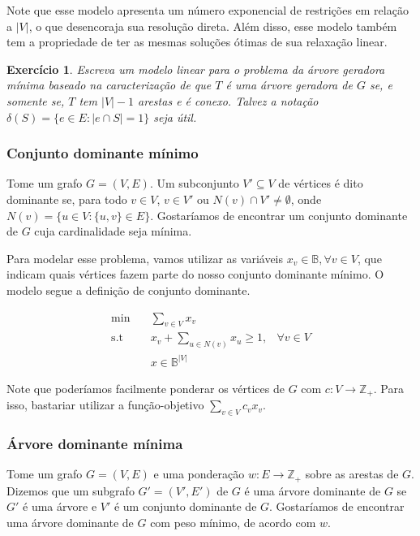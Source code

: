 \documentclass[]{article}
\newtheorem{exercicio}{Exercício}
\numberwithin{equation}{section}
\begin{document}
Note que esse modelo apresenta um número exponencial de restrições em relação a $|V|$, o que
desencoraja sua resolução direta.
Além disso, esse modelo também tem a propriedade de ter as mesmas soluções ótimas de sua relaxação
linear.

\begin{exercicio}
  Escreva um modelo linear para o problema da árvore geradora mínima baseado na caracterização de que
  $T$ é uma árvore geradora de $G$ se, e somente se, $T$ tem $|V| - 1$ arestas e é conexo.
  Talvez a notação $\delta(S) = \{e \in E : |e \cap S| = 1\}$ seja útil.
\end{exercicio}

\subsubsection{Conjunto dominante mínimo}

Tome um grafo $G = (V, E)$.
Um subconjunto $V' \subseteq V$ de vértices é dito dominante se, para todo $v \in V$, $v \in V'$ ou
$N(v) \cap V' \neq \emptyset$, onde $N(v) = \{u \in V : \{u, v\} \in E\}$.
Gostaríamos de encontrar um conjunto dominante de $G$ cuja cardinalidade seja mínima.

Para modelar esse problema, vamos utilizar as variáveis $x_v \in \mathbb{B}, \forall v \in V$, que
indicam quais vértices fazem parte do nosso conjunto dominante mínimo.
O modelo segue a definição de conjunto dominante.

\begin{align}
\min        &\quad  \sum_{v \in V} x_v \\
\text{s.t}  &\quad  x_v + \sum_{u \in N(v)} x_u \geq 1, & \forall v \in V \\
            &\quad  x \in \mathbb{B}^{|V|}
\end{align}

Note que poderíamos facilmente ponderar os vértices de $G$ com $c : V \to \mathbb{Z}_+$.
Para isso, bastariar utilizar a função-objetivo $\sum_{v \in V} c_vx_v$.

\subsubsection{Árvore dominante mínima}

Tome um grafo $G = (V, E)$ e uma ponderação $w : E \to \mathbb{Z}_+$ sobre as arestas de $G$.
Dizemos que um subgrafo $G' = (V', E')$ de $G$ é uma árvore dominante de $G$ se $G'$ é uma árvore e
$V'$ é um conjunto dominante de $G$.
Gostaríamos de encontrar uma árvore dominante de $G$ com peso mínimo, de acordo com $w$.
\end{document}

